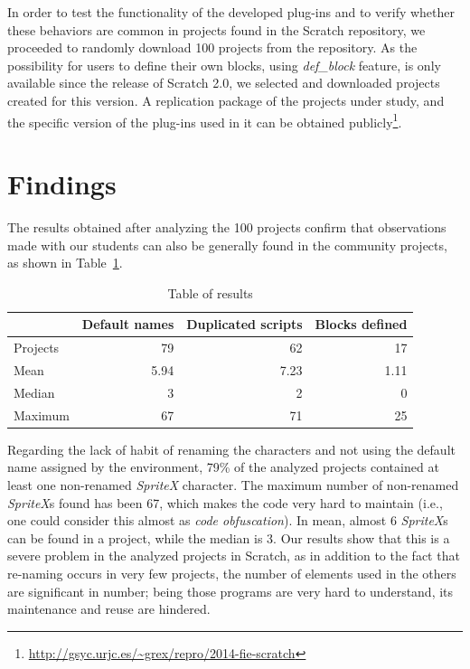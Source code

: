 \documentclass[conference]{format/IEEEtran}
\begin{document}
In order to test the functionality of the developed plug-ins and to verify whether these behaviors are common in projects found in the Scratch repository, we proceeded to randomly download 100 projects from the repository. As the possibility for users to define their own blocks, using \textit{def\_block} feature, is only available since the release of Scratch 2.0, we selected and downloaded projects created for this version. A replication package of the projects under study, and the specific version of the plug-ins used in it can be obtained publicly\footnote{\url{http://gsyc.urjc.es/~grex/repro/2014-fie-scratch}}.


\section{Findings}
\label{sec:findings}

The results obtained after analyzing the 100 projects confirm that observations made with our students can also be generally found in the community projects, as shown in Table~\ref{table:results}.

\begin{table}
\begin{center}
  \begin{tabular}{ | l | r | r | r |}
   \hline
              & Default names & Duplicated scripts & Blocks defined \\ \hline\hline
    Projects & 79 & 62 & 17 \\ \hline
    Mean & 5.94 & 7.23 & 1.11 \\ \hline
    Median & 3 & 2 & 0 \\ \hline
    Maximum & 67 & 71 & 25 \\
    \hline    
  \end{tabular}
\end{center}
\caption{Table of results}
\label{table:results}
\end{table}

Regarding the lack of habit of renaming the characters and not using the default name assigned by the environment, 79\% of the analyzed projects contained at least one non-renamed \textit{SpriteX} character. The maximum number of non-renamed \textit{SpriteX}s found has been 67, which makes the code very hard to maintain (i.e., one could consider this almost as \emph{code obfuscation}). In mean, almost 6 \textit{SpriteX}s can be found in a project, while the median is 3. Our results show that this is a severe problem in the analyzed projects in Scratch, as in addition to the fact that re-naming occurs in very few projects, the number of elements used in the others are significant in number; being those programs are very hard to understand, its maintenance and reuse are hindered.
\end{document}
